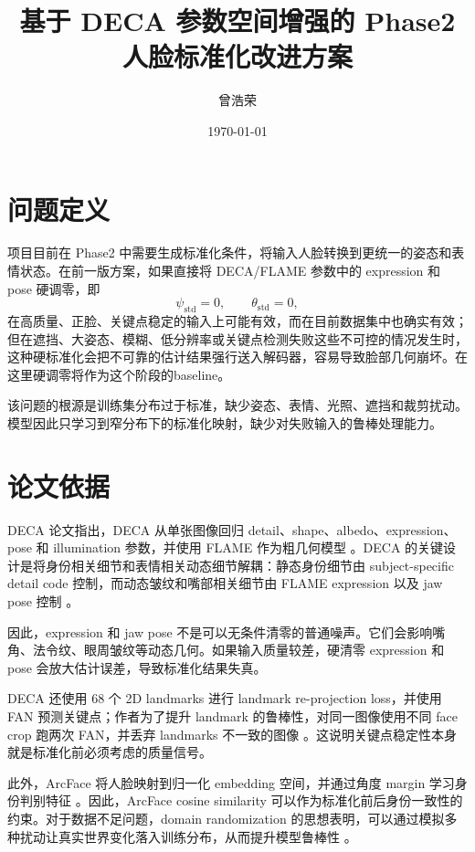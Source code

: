 \documentclass[UTF8,12pt,fontset=fandol]{ctexart}
\title{基于 DECA 参数空间增强的 Phase2 人脸标准化改进方案}
\author{曾浩荣}
\date{\today}
\begin{document}
\maketitle

\section{问题定义}

项目目前在 Phase2 中需要生成标准化条件，将输入人脸转换到更统一的姿态和表情状态。在前一版方案，如果直接将 DECA/FLAME 参数中的 expression 和 pose 硬调零，即
\[
\psi_{\text{std}} = 0,\qquad \theta_{\text{std}} = 0,
\]
在高质量、正脸、关键点稳定的输入上可能有效，而在目前数据集中也确实有效；但在遮挡、大姿态、模糊、低分辨率或关键点检测失败这些不可控的情况发生时，这种硬标准化会把不可靠的估计结果强行送入解码器，容易导致脸部几何崩坏。在这里硬调零将作为这个阶段的baseline。

该问题的根源是训练集分布过于标准，缺少姿态、表情、光照、遮挡和裁剪扰动。模型因此只学习到窄分布下的标准化映射，缺少对失败输入的鲁棒处理能力。

\section{论文依据}

DECA 论文指出，DECA 从单张图像回归 detail、shape、albedo、expression、pose 和 illumination 参数，并使用 FLAME 作为粗几何模型 \cite{deca2021,flame2017}。DECA 的关键设计是将身份相关细节和表情相关动态细节解耦：静态身份细节由 subject-specific detail code 控制，而动态皱纹和嘴部相关细节由 FLAME expression 以及 jaw pose 控制 \cite{deca2021}。

因此，expression 和 jaw pose 不是可以无条件清零的普通噪声。它们会影响嘴角、法令纹、眼周皱纹等动态几何。如果输入质量较差，硬清零 expression 和 pose 会放大估计误差，导致标准化结果失真。

DECA 还使用 68 个 2D landmarks 进行 landmark re-projection loss，并使用 FAN 预测关键点；作者为了提升 landmark 的鲁棒性，对同一图像使用不同 face crop 跑两次 FAN，并丢弃 landmarks 不一致的图像 \cite{deca2021,fan2017}。这说明关键点稳定性本身就是标准化前必须考虑的质量信号。

此外，ArcFace 将人脸映射到归一化 embedding 空间，并通过角度 margin 学习身份判别特征 \cite{arcface2019}。因此，ArcFace cosine similarity 可以作为标准化前后身份一致性的约束。对于数据不足问题，domain randomization 的思想表明，可以通过模拟多种扰动让真实世界变化落入训练分布，从而提升模型鲁棒性 \cite{domainrandomization2017}。
\end{document}
